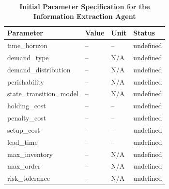     
    \begin{table}[!ht]
        \centering
        \renewcommand{\arraystretch}{1.1}
        \begin{tabular}{P V U T}
            \toprule
            \textbf{Parameter} & \textbf{Value} & \textbf{Unit} & \textbf{Status} \\
            \midrule
            time\_horizon            & -- & --  & undefined \\
            demand\_type             & -- & N/A & undefined \\
            demand\_distribution     & -- & N/A & undefined \\
            perishability            & -- & N/A & undefined \\
            state\_transition\_model & -- & N/A & undefined \\
            holding\_cost            & -- & --  & undefined \\
            penalty\_cost            & -- & --  & undefined \\
            setup\_cost              & -- & --  & undefined \\
            lead\_time               & -- & --  & undefined \\
            max\_inventory           & -- & N/A & undefined \\
            max\_order               & -- & N/A & undefined \\
            risk\_tolerance          & -- & N/A & undefined \\
            \bottomrule
        \end{tabular}
        \caption{\textbf{Initial Parameter Specification for the Information Extraction Agent}}
        \vspace{1.2em}
        \label{tab:initial_params}
        

\end{table}
